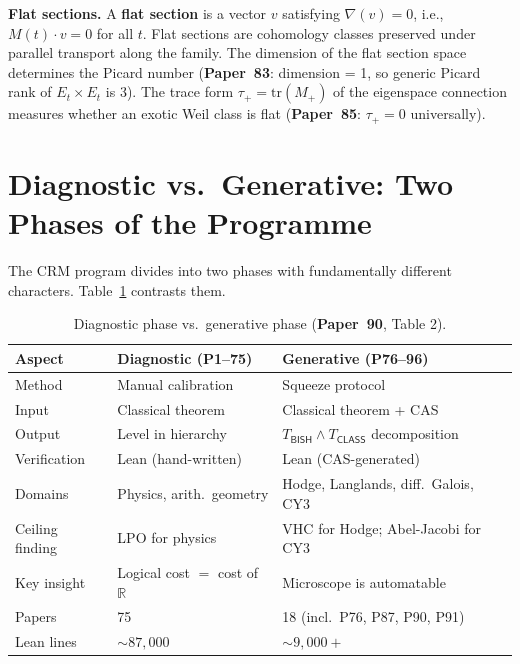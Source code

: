 \documentclass[11pt,twoside,openany]{report}
\theoremstyle{remark}
\newcommand{\BISH}{\textsf{BISH}}
\newcommand{\LPO}{\textsf{LPO}}
\newcommand{\CLASS}{\textsf{CLASS}}
\newcommand{\paperref}[1]{\textbf{Paper~#1}}
\begin{document}
\textbf{Flat sections.} A \textbf{flat section} is a vector $v$ satisfying $\nabla(v) = 0$, i.e., $M(t) \cdot v = 0$ for all $t$. Flat sections are cohomology classes preserved under parallel transport along the family. The dimension of the flat section space determines the Picard number (\paperref{83}: dimension = 1, so generic Picard rank of $E_t \times E_t$ is 3). The trace form $\tau_+ = \mathrm{tr}(M_+)$ of the eigenspace connection measures whether an exotic Weil class is flat (\paperref{85}: $\tau_+ = 0$ universally).


\section{Diagnostic vs.\ Generative: Two Phases of the Programme}

The CRM program divides into two phases with fundamentally different characters. Table~\ref{tab:phase-comparison} contrasts them.

\begin{table}[htbp]
\centering\small
\caption{Diagnostic phase vs.\ generative phase (\paperref{90}, Table 2).}
\label{tab:phase-comparison}
\renewcommand{\arraystretch}{1.15}
\begin{tabular}{@{}l p{4.5cm} p{4.5cm}@{}}
\toprule
\textbf{Aspect} & \textbf{Diagnostic (P1--75)} & \textbf{Generative (P76--96)} \\
\midrule
Method & Manual calibration & Squeeze protocol \\
Input & Classical theorem & Classical theorem + CAS \\
Output & Level in hierarchy & $T_{\BISH} \wedge T_{\CLASS}$ decomposition \\
Verification & Lean (hand-written) & Lean (CAS-generated) \\
Domains & Physics, arith.\ geometry & Hodge, Langlands, diff.\ Galois, CY3 \\
Ceiling finding & \LPO{} for physics & VHC for Hodge; Abel-Jacobi for CY3 \\
Key insight & Logical cost $=$ cost of $\mathbb{R}$ & Microscope is automatable \\
Papers & 75 & 18 (incl.\ P76, P87, P90, P91) \\
Lean lines & ${\sim}87{,}000$ & ${\sim}9{,}000+$ \\
\bottomrule
\end{tabular}
\end{table}
\end{document}
